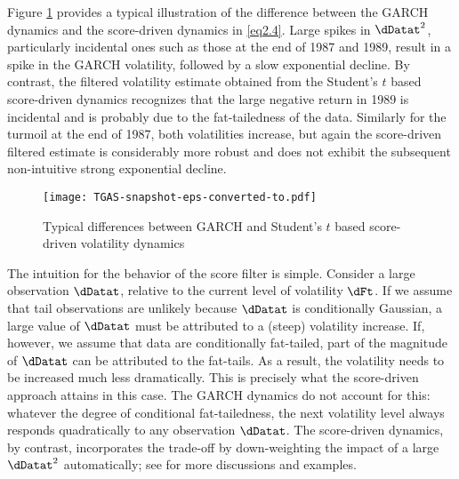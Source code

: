 Figure \ref{fig:TGAS} provides a typical illustration of the difference between the GARCH dynamics and the score-driven dynamics in \eqref{eq2.4}. Large spikes in $\dDatat^2$, particularly incidental ones such as those at the end of 1987 and 1989, result in a spike in the GARCH volatility, followed by a slow exponential decline. By contrast, the filtered volatility estimate obtained from the Student's $t$ based score-driven dynamics recognizes that the large negative return in 1989 is incidental and is probably due to the fat-tailedness of the data. Similarly for the turmoil at the end of 1987, both volatilities increase, but again the score-driven filtered estimate is considerably more robust and does not exhibit the subsequent non-intuitive strong exponential decline. 

\begin{figure}[!t]
	\centering
		\texttt{[image: TGAS-snapshot-eps-converted-to.pdf]}
	\caption{Typical differences between GARCH and Student's $t$ based score-driven volatility dynamics\label{fig:TGAS}}
\end{figure}

The intuition for the behavior of the score filter is simple. Consider a large observation $\dDatat$, relative to the current level of volatility $\dFt$.
If we assume that tail observations are unlikely because $\dDatat$ is conditionally Gaussian, a large value of $\dDatat$ must be attributed to a (steep) volatility increase.
If, however, we assume that data are conditionally fat-tailed, part of the magnitude of $\dDatat$ can be attributed to the fat-tails. As a result, the volatility needs to be increased much less dramatically.
This is precisely what the score-driven approach attains in this case.
The GARCH dynamics do not account for this: whatever the degree of conditional fat-tailedness, the next volatility level always responds quadratically to any observation $\dDatat$. 
The score-driven dynamics, by contrast, incorporates the trade-off by down-weighting the impact of a large $\dDatat^2$ automatically; see \citet{CKL2011,CKL2013} for more discussions and examples.



